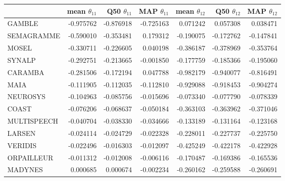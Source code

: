 \begin{tabular}{lrrrrrr}
\toprule
{} &  mean $\theta_{11}$ &  Q50 $\theta_{11}$ &  MAP $\theta_{11}$ &  mean $\theta_{12}$ &  Q50 $\theta_{12}$ &  MAP $\theta_{12}$ \\
\midrule
GAMBLE      &           -0.975762 &          -0.876918 &          -0.725163 &            0.071242 &           0.057308 &           0.038471 \\
SEMAGRAMME  &           -0.590010 &          -0.353481 &           0.179312 &           -0.190075 &          -0.172762 &          -0.147841 \\
MOSEL       &           -0.330711 &          -0.226605 &           0.040198 &           -0.386187 &          -0.378969 &          -0.353764 \\
SYNALP      &           -0.292751 &          -0.213665 &          -0.001850 &           -0.177759 &          -0.185366 &          -0.195060 \\
CARAMBA     &           -0.281506 &          -0.172194 &           0.047788 &           -0.982179 &          -0.940077 &          -0.816491 \\
MAIA        &           -0.111905 &          -0.112035 &          -0.112810 &           -0.929088 &          -0.918453 &          -0.904274 \\
NEUROSYS    &           -0.104963 &          -0.085756 &          -0.015696 &           -0.073340 &          -0.077790 &          -0.078339 \\
COAST       &           -0.076206 &          -0.068637 &          -0.050184 &           -0.363103 &          -0.363962 &          -0.371046 \\
MULTISPEECH &           -0.040704 &          -0.038330 &          -0.034666 &           -0.133189 &          -0.131164 &          -0.123168 \\
LARSEN      &           -0.024114 &          -0.024729 &          -0.022328 &           -0.228011 &          -0.227737 &          -0.225750 \\
VERIDIS     &           -0.022496 &          -0.016303 &          -0.012097 &           -0.425249 &          -0.422178 &          -0.422928 \\
ORPAILLEUR  &           -0.011312 &          -0.012008 &          -0.006116 &           -0.170487 &          -0.169386 &          -0.165536 \\
MADYNES     &            0.000685 &           0.000674 &          -0.002234 &           -0.260162 &          -0.259588 &          -0.260691 \\

\end{tabular}
